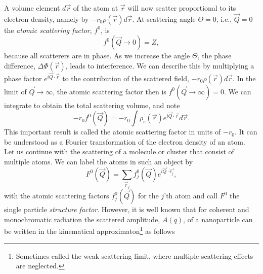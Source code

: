 %
A volume element $d\vec{r}$ of the atom at $\vec{r}$ will now scatter proportional to its electron density, namely by $-r_{0}\rho\left(\vec{r}\right)d\vec{r}$. At scattering angle $\Theta=0$, i.e., $\vec{Q}=0$ the \textit{atomic scattering factor}, $f^{0}$, is
\begin{equation}
f^{0}\left(\vec{Q}\rightarrow 0\right)=Z,
\label{eq:transform-number-of-particles}
\end{equation}
because all scatterers are in phase. As we increase the angle $\Theta$, the phase difference, $\Delta \Phi\left(\vec{r}\right)$, leads to interference. We can describe this by multiplying a phase factor $e^{i \vec{Q}\cdot \vec{r}}$ to the contribution of the scattered field, $-r_{0}\rho\left(\vec{r}\right)d\vec{r}$. In the limit of $\vec{Q}\rightarrow\infty$, the atomic scattering factor then is $f^{0}\left(\vec{Q}\rightarrow\infty\right)=0$. We can integrate to obtain the total scattering volume, and note
\begin{equation}
-r_{0} f^{0}\left(\vec{Q}\right)=-r_{0}\int\rho_{e}\left(\vec{r}\right)e^{i \vec{Q}\cdot \vec{r}}d\vec{r}.
\label{eq:scattering-integral}
\end{equation}
This important result is called the atomic scattering factor in units of $-r_{0}$. It can be understood as a Fourier transformation of the electron density of an atom.\\[1\baselineskip]
%
Let us continue with the scattering of a molecule or cluster that consist of multiple atoms. We can label the atoms in such an object by
\begin{equation}
F^{0}\left(\vec{Q}\right)=\sum_{\vec{r}_j}f_{j}^{0}\left(\vec{Q}\right)e^{i \vec{Q}\cdot \vec{r_{j}}},
\label{eq:scattering-factor-object}
\end{equation}
with the atomic scattering factors $f_{j}^{0}\left(\vec{Q}\right)$ for the $j$'th atom and call $F^{0}$ the single particle \textit{structure factor}. However, it is well known that for coherent and monochromatic radiation the scattered amplitude, $A(q)$, of a nanoparticle can be written in the kinematical approximaton\footnote{Sometimes called the weak-scattering limit, where multiple scattering effects are neglected.} as follows \citep{Vartanyants-2001-JOP}
